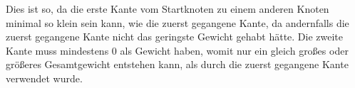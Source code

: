 \documentclass[10pt,a4paper,oneside,ngerman,numbers=noenddot]{scrartcl}
\begin{document}
	Dies ist so, da die erste Kante vom Startknoten zu einem anderen Knoten minimal so klein sein kann, wie die zuerst gegangene Kante, da andernfalls die zuerst gegangene Kante nicht das geringste Gewicht gehabt hätte. Die zweite Kante muss mindestens 0 als Gewicht haben, womit nur ein gleich großes oder größeres Gesamtgewicht entstehen kann, als durch die zuerst gegangene Kante verwendet wurde.
\section{} %
	\subsection{} %
	\subsection{} %
\section{} %
	\subsection{} %
	\subsection{} %
\section{} %
\end{document}
